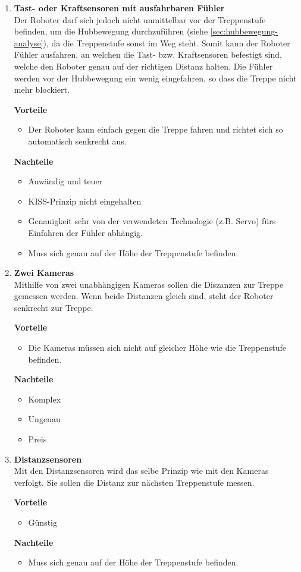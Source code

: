 \begin{enumerate}
    \item \textbf{Tast- oder Kraftsensoren mit ausfahrbaren Fühler}\\
    Der Roboter darf sich jedoch nicht unmittelbar vor der Treppenstufe befinden, um die Hubbewegung durchzuführen (siehe \ref{sec:hubbewegung-analyse}), da die Treppenstufe sonst im Weg steht. Somit kann der Roboter Fühler ausfahren, an welchen die Tast- bzw. Kraftsensoren befestigt sind, welche den Roboter genau auf der richtigen Distanz halten. Die Fühler werden vor der Hubbewegung ein wenig eingefahren, so dass die Treppe nicht mehr blockiert.
    
    \textbf{Vorteile}
    \begin{itemize}
        \item Der Roboter kann einfach gegen die Treppe fahren und richtet sich so automatisch senkrecht aus.
    \end{itemize}
    \textbf{Nachteile}
    \begin{itemize}
        \item Auwändig und teuer
        \item KISS-Prinzip nicht eingehalten
        \item Genauigkeit sehr von der verwendeten Technologie (z.B. Servo) fürs Einfahren der Fühler
        abhängig. 
        \item Muss sich genau auf der Höhe der Treppenstufe befinden.
    \end{itemize}
    
    \item \textbf{Zwei Kameras}\\
    Mithilfe von zwei unabhängigen Kameras sollen die Diszanzen zur Treppe gemessen werden. Wenn beide Distanzen gleich sind, steht der Roboter senkrecht zur Treppe.
    
    \textbf{Vorteile}
    \begin{itemize}
        \item Die Kameras müssen sich nicht auf gleicher Höhe wie die Treppenstufe befinden.
    \end{itemize}
    \textbf{Nachteile}
    \begin{itemize}
        \item Komplex
        \item Ungenau
        \item Preis
    \end{itemize}
    
    \item \textbf{Distanzsensoren}\\
    Mit den Distanzsensoren wird das selbe Prinzip wie mit den Kameras verfolgt. Sie sollen die Distanz zur nächsten Treppenstufe messen.
    
    \textbf{Vorteile}
    \begin{itemize}
        \item Günstig
    \end{itemize}
    \textbf{Nachteile}
    \begin{itemize}
        \item Muss sich genau auf der Höhe der Treppenstufe befinden.
    \end{itemize}
\end{enumerate}
